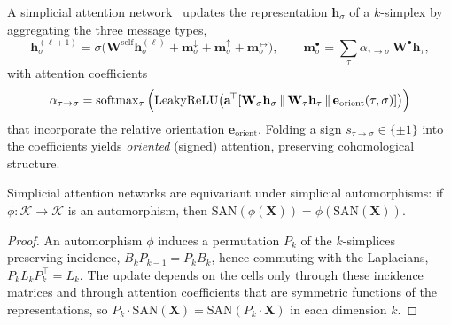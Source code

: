\begin{definition}
\label{def:gauge:simplicial-attention}
A simplicial attention network~\citep{giusti2022simplicial} updates the
representation $\mathbf{h}_\sigma$ of a $k$-simplex by aggregating the three
message types,
\[
  \mathbf{h}_\sigma^{(\ell+1)} = \sigma\!\Big(\mathbf{W}^{\text{self}}
  \mathbf{h}_\sigma^{(\ell)} + \mathbf{m}_\sigma^{\downarrow} +
  \mathbf{m}_\sigma^{\uparrow} + \mathbf{m}_\sigma^{\leftrightarrow}\Big),
  \qquad
  \mathbf{m}_\sigma^{\bullet} = \sum_\tau \alpha_{\tau\to\sigma}\,
  \mathbf{W}^{\bullet}\mathbf{h}_\tau,
\]
with attention coefficients
\[
  \alpha_{\tau\to\sigma} = \operatorname{softmax}_\tau\Big(\mathrm{LeakyReLU}\big(\mathbf{a}^{\!\top}
  [\mathbf{W}_\sigma\mathbf{h}_\sigma \,\|\, \mathbf{W}_\tau\mathbf{h}_\tau \,\|\,
  \mathbf{e}_{\text{orient}}(\tau, \sigma)]\big)\Big)
\]
that incorporate the relative orientation $\mathbf{e}_{\text{orient}}$. Folding a
sign $s_{\tau\to\sigma} \in \{\pm 1\}$ into the coefficients yields
\emph{oriented} (signed) attention, preserving cohomological structure.
\end{definition}

\begin{theorem}
\label{thm:gauge:simplicial-equivariance}
Simplicial attention networks are equivariant under simplicial automorphisms: if
$\phi\colon \mathcal{K} \to \mathcal{K}$ is an automorphism, then
$\mathrm{SAN}(\phi(\mathbf{X})) = \phi(\mathrm{SAN}(\mathbf{X}))$.
\end{theorem}

\begin{proof}
An automorphism $\phi$ induces a permutation $P_k$ of the $k$-simplices
preserving incidence, $B_k P_{k-1} = P_k B_k$, hence commuting with the
Laplacians, $P_k L_k P_k^{\!\top} = L_k$. The update depends on the cells only
through these incidence matrices and through attention coefficients that are
symmetric functions of the representations, so $P_k\cdot\mathrm{SAN}(\mathbf{X}) =
\mathrm{SAN}(P_k\cdot\mathbf{X})$ in each dimension $k$.
\end{proof}

